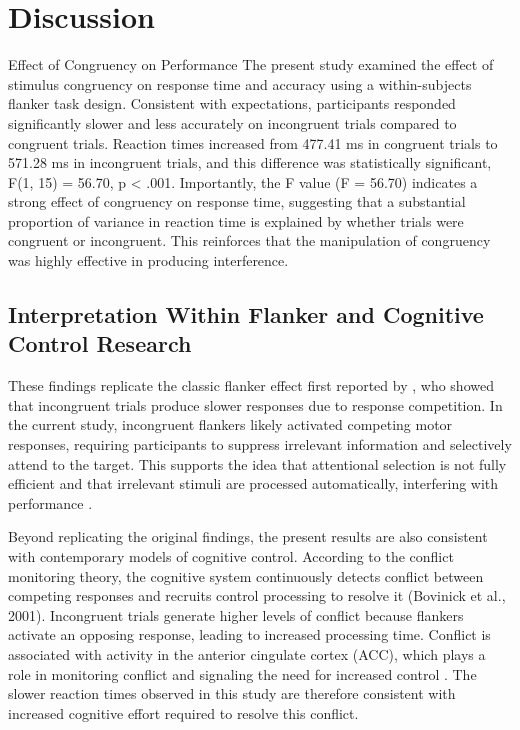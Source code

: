 \documentclass[
  authoryear,
  preprint]{elsarticle}
\begin{document}
\section{Discussion}\label{discussion}

Effect of Congruency on Performance The present study examined the
effect of stimulus congruency on response time and accuracy using a
within-subjects flanker task design. Consistent with expectations,
participants responded significantly slower and less accurately on
incongruent trials compared to congruent trials. Reaction times
increased from 477.41 ms in congruent trials to 571.28 ms in incongruent
trials, and this difference was statistically significant, F(1, 15) =
56.70, p \textless{} .001. Importantly, the F value (F = 56.70)
indicates a strong effect of congruency on response time, suggesting
that a substantial proportion of variance in reaction time is explained
by whether trials were congruent or incongruent. This reinforces that
the manipulation of congruency was highly effective in producing
interference.

\subsection{Interpretation Within Flanker and Cognitive Control
Research}\label{interpretation-within-flanker-and-cognitive-control-research}

These findings replicate the classic flanker effect first reported by
\citet{eriksen1974}, who showed that incongruent trials produce slower
responses due to response competition. In the current study, incongruent
flankers likely activated competing motor responses, requiring
participants to suppress irrelevant information and selectively attend
to the target. This supports the idea that attentional selection is not
fully efficient and that irrelevant stimuli are processed automatically,
interfering with performance \citep{eriksen1974}.

Beyond replicating the original findings, the present results are also
consistent with contemporary models of cognitive control. According to
the conflict monitoring theory, the cognitive system continuously
detects conflict between competing responses and recruits control
processing to resolve it (Bovinick et al., 2001). Incongruent trials
generate higher levels of conflict because flankers activate an opposing
response, leading to increased processing time. Conflict is associated
with activity in the anterior cingulate cortex (ACC), which plays a role
in monitoring conflict and signaling the need for increased control
\citep{botvinick2001}. The slower reaction times observed in this study
are therefore consistent with increased cognitive effort required to
resolve this conflict.
\end{document}
